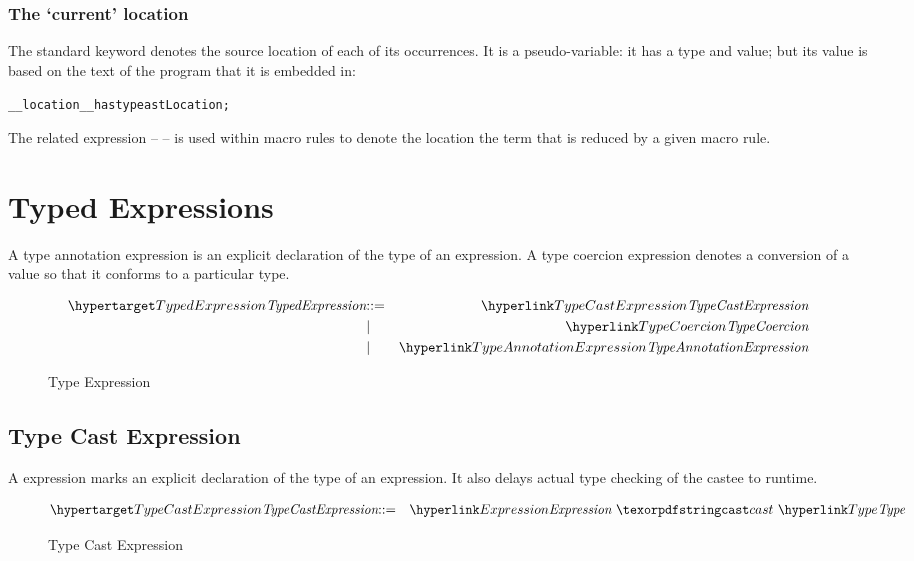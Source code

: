 \subsubsection{The `current' location}
\label{locationVar}

The standard keyword  denotes the source location of each of its occurrences. It is a pseudo-variable: it has a type and value; but its value is based on the text of the program that it is embedded in:
\begin{alltt}
\_\_location\_\_ has type astLocation;
\end{alltt}
\begin{aside}
The related expression --  -- is used within macro rules to denote the location the term that is reduced by a given macro rule.
\end{aside}

\section{Typed Expressions}
\label{typeExpression}
A type annotation expression is an explicit declaration of the type of an expression. A type coercion expression denotes a conversion of a value so that it conforms to a particular type.

\begin{figure}[htbp]
\begin{eqnarray*}
\ntDef{TypedExpression}&\arrow&\ntRef{TypeCastExpression}\\
&\choice&\ntRef{TypeCoercion}\\
&\choice&\ntRef{TypeAnnotationExpression}
\end{eqnarray*}
\caption{Type Expression}
\label{typedExpressionFig}
\end{figure}


\subsection{Type Cast Expression}
\label{typeCastExpression}
A  expression marks an explicit declaration of the type of an expression. It also delays actual type checking of the castee to runtime.

\begin{figure}[htbp]
\begin{eqnarray*}
\ntDef{TypeCastExpression}&\arrow&\ntRef{Expression}\ \q{cast}\ \ntRef{Type}
\end{eqnarray*}
\caption{Type Cast Expression}
\label{typeCastExpressionFig}
\end{figure}

